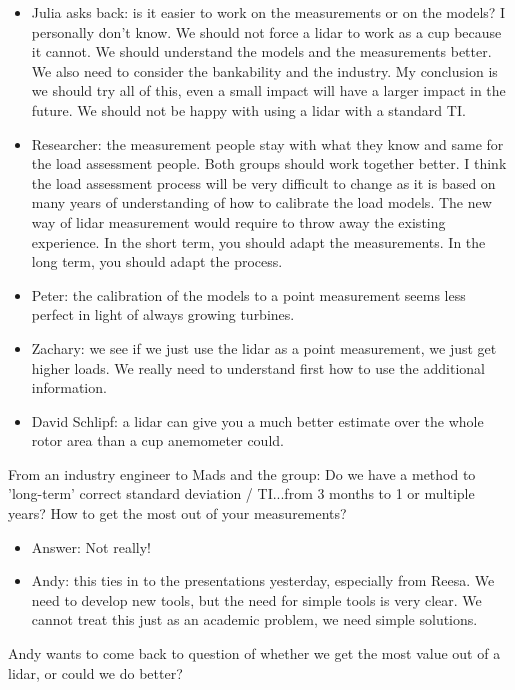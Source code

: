 \begin{itemize}
\item  Julia asks back: is it easier to work on the measurements or on the models? I personally don't know. We should not force a lidar to work as a cup because it cannot. We should understand the models and the measurements better. We also need to consider the bankability and the industry. My conclusion is we should try all of this, even a small impact will have a larger impact in the future. We should not be happy with using a lidar with a standard TI.
\item  Researcher: the measurement people stay with what they know and same for the load assessment people. Both groups should work together better. I think the load assessment process will be very difficult to change as it is based on many years of understanding of how to calibrate the load models. The new way of lidar measurement would require to throw away the existing experience. In the short term, you should adapt the measurements. In the long term, you should adapt the process.
\item  Peter: the calibration of the models to a point measurement seems less perfect in light of always growing turbines. 
\item Zachary: we see if we just use the lidar as a point measurement, we just get higher loads. We really need to understand first how to use the additional  information.
\item  David Schlipf: a lidar can give you a much better estimate over the whole rotor area than a cup anemometer could.
\end{itemize}

From an industry engineer to Mads and the group: Do we have a method to 'long-term' correct standard deviation / TI...from 3 months to 1 or multiple years? How to get the most out of your measurements?

\begin{itemize}
\item  Answer: Not really!
\item  Andy: this ties in to the presentations yesterday, especially from Reesa. We need to develop new tools, but the need for simple tools is very clear. We cannot treat this just as an academic problem, we need simple solutions.
\end{itemize}

Andy wants to come back to question of whether we get the most value out of a lidar, or could we do better?

